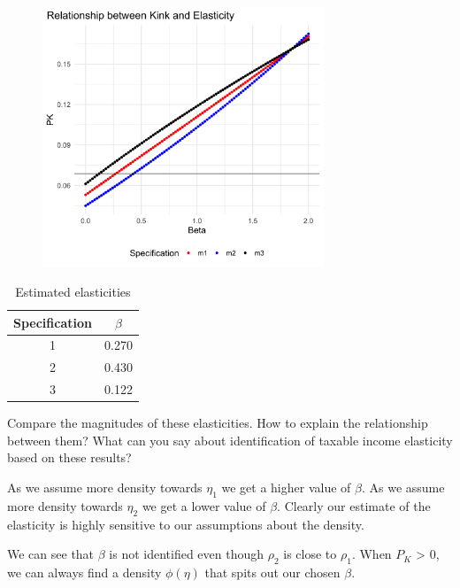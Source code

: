 \documentclass{article}
\begin{document}
\begin{solution}
\begin{figure}[!htb]
    \centering    
    \includegraphics[width=0.75\textwidth]{ps2/4c.png}
\end{figure}

\begin{table}
\centering
\begin{tabular}{|c|c|}
\hline 
Specification & $\beta$\tabularnewline
\hline 
\hline 
1 & 0.270\tabularnewline
\hline 
2 & 0.430\tabularnewline
\hline 
3 & 0.122\tabularnewline
\hline 
\end{tabular}

\caption{Estimated elasticities}
\end{table}


\end{solution}

\pagebreak
\begin{problem}
Compare the magnitudes of these elasticities. How to explain the relationship between them? What can you say about identification of taxable income elasticity based on these results?
\end{problem}
\begin{solution}

As we assume more density towards $\eta_{1}$ we get a higher value
of $\beta$. As we assume more density towards $\eta_{2}$ we get
a lower value of $\beta$. Clearly our estimate of the elasticity
is highly sensitive to our assumptions about the density. 

We can see that $\beta$ is not identified even though $\rho_{2}$
is close to $\rho_{1}$. When $P_{K}$ > 0, we can always find a density
$\phi\left(\eta\right)$ that spits out our chosen $\beta$.
\end{solution}
\end{document}
